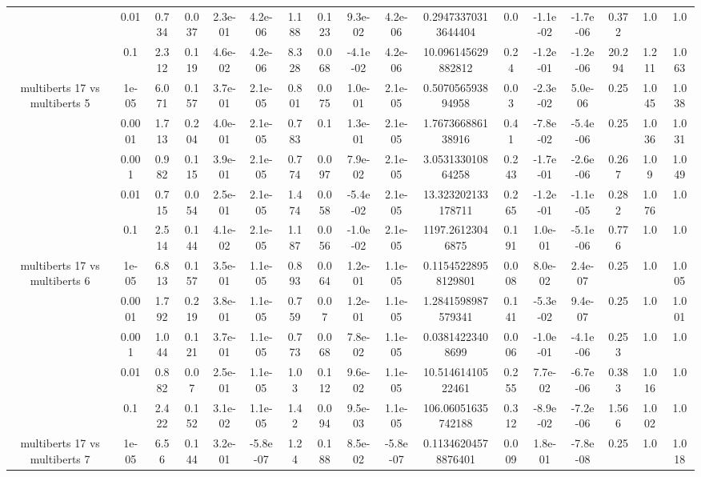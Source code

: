 \begin{tabular}{|c|c|c|c|c|c|c|c|c|c|c|c|c|c|c|c|c|}
 & 0.01 & 0.734 & 0.037 & 2.3e-01 & 4.2e-06 & 1.188 & 0.123 & 9.3e-02 & 4.2e-06 & 0.29473370313644404 & 0.0 & -1.1e-02 & -1.7e-06 & 0.372 & 1.0 & 1.0 \\
 & 0.1 & 2.312 & 0.119 & 4.6e-02 & 4.2e-06 & 8.328 & 0.068 & -4.1e-02 & 4.2e-06 & 10.096145629882812 & 0.24 & -1.2e-01 & -1.2e-06 & 20.294 & 1.211 & 1.063 \\
\hline
\multirow{5}{*}{multiberts 17 vs multiberts 5} & 1e-05 & 6.071 & 0.157 & 3.7e-01 & 2.1e-05 & 0.801 & 0.075 & 1.0e-01 & 2.1e-05 & 0.507056593894958 & 0.03 & -2.3e-02 & 5.0e-06 & 0.25 & 1.045 & 1.038 \\
 & 0.0001 & 1.713 & 0.204 & 4.0e-01 & 2.1e-05 & 0.783 & 0.1 & 1.3e-01 & 2.1e-05 & 1.767366886138916 & 0.41 & -7.8e-02 & -5.4e-06 & 0.25 & 1.036 & 1.031 \\
 & 0.001 & 0.982 & 0.115 & 3.9e-01 & 2.1e-05 & 0.774 & 0.097 & 7.9e-02 & 2.1e-05 & 3.053133010864258 & 0.243 & -1.7e-01 & -2.6e-06 & 0.267 & 1.09 & 1.049 \\
 & 0.01 & 0.715 & 0.054 & 2.5e-01 & 2.1e-05 & 1.474 & 0.058 & -5.4e-02 & 2.1e-05 & 13.323202133178711 & 0.265 & -1.2e-01 & -1.1e-05 & 0.282 & 1.076 & 1.0 \\
 & 0.1 & 2.514 & 0.144 & 4.1e-02 & 2.1e-05 & 1.187 & 0.056 & -1.0e-02 & 2.1e-05 & 1197.26123046875 & 0.191 & 1.0e-01 & -5.1e-06 & 0.776 & 1.0 & 1.0 \\
\hline
\multirow{5}{*}{multiberts 17 vs multiberts 6} & 1e-05 & 6.813 & 0.157 & 3.5e-01 & 1.1e-05 & 0.893 & 0.064 & 1.2e-01 & 1.1e-05 & 0.11545228958129801 & 0.008 & 8.0e-02 & 2.4e-07 & 0.25 & 1.0 & 1.005 \\
 & 0.0001 & 1.792 & 0.219 & 3.8e-01 & 1.1e-05 & 0.759 & 0.07 & 1.2e-01 & 1.1e-05 & 1.2841598987579341 & 0.141 & -5.3e-02 & 9.4e-07 & 0.25 & 1.0 & 1.001 \\
 & 0.001 & 1.044 & 0.121 & 3.7e-01 & 1.1e-05 & 0.773 & 0.068 & 7.8e-02 & 1.1e-05 & 0.03814223408699 & 0.006 & -1.0e-01 & -4.1e-06 & 0.253 & 1.0 & 1.0 \\
 & 0.01 & 0.882 & 0.07 & 2.5e-01 & 1.1e-05 & 1.03 & 0.112 & 9.6e-02 & 1.1e-05 & 10.51461410522461 & 0.255 & 7.7e-02 & -6.7e-06 & 0.383 & 1.016 & 1.0 \\
 & 0.1 & 2.422 & 0.152 & 3.1e-02 & 1.1e-05 & 1.42 & 0.094 & 9.5e-03 & 1.1e-05 & 106.06051635742188 & 0.312 & -8.9e-02 & -7.2e-06 & 1.566 & 1.002 & 1.0 \\
\hline
\multirow{5}{*}{multiberts 17 vs multiberts 7} & 1e-05 & 6.56 & 0.144 & 3.2e-01 & -5.8e-07 & 1.24 & 0.188 & 8.5e-02 & -5.8e-07 & 0.11346204578876401 & 0.009 & 1.8e-01 & -7.8e-08 & 0.25 & 1.0 & 1.018 \\

\end{tabular}
